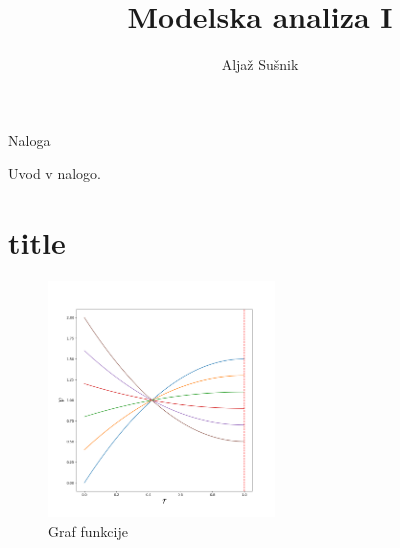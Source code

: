 \documentclass{article}
\title{Modelska analiza I}
\author{Alja\v z Su\v snik}
\begin{document}
\maketitle

\centerline{\large Naloga }

Uvod v nalogo.  

\section{title}



\begin{figure}
    \centering
    \includegraphics[width=6cm]{Figure_1.png}
    \caption{Graf funkcije}
    \label{fig:1}
\end{figure}






%
\end{document}
